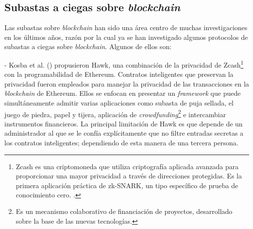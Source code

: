   \subsection{Subastas a ciegas sobre \textit{blockchain}} \hspace*{}
    Las subastas sobre \textit{blockchain} han sido una área centro de muchas investigaciones en los últimos años, razón por la cual ya se
    han investigado algunos protocolos de subastas a ciegas sobre \textit{blockchain}. Algunos de ellos son:    

    - Kosba et al. (\citeyear{kosba2016hawk}) propusieron Hawk, una combinación de la privacidad de 
    Zcash\footnote{Zcash es una criptomoneda que 
    utiliza criptografía aplicada avanzada para proporcionar una mayor privacidad a través de direcciones 
    protegidas. Es la primera aplicación práctica de zk-SNARK, un tipo específico de prueba de 
    conocimiento cero. \parencite{zcash}.} 
    con la programabilidad
    de Ethereum. Contratos inteligentes que preservan la privacidad fueron empleados para manejar la 
    privacidad de las transacciones en la \textit{blockchain} de Ethereum. Ellos se enfocan en presentar
    un \textit{framework} que puede simultáneamente admitir varias aplicaciones como subasta de puja sellada,
    el juego de piedra, papel y tijera, aplicación de \textit{crowdfunding}\footnote{Es un mecanismo colaborativo de financiación de 
    proyectos, desarrollado sobre la base de las nuevas tecnologías.} e intercambiar instrumentos 
    financieros. La principal limitación de Hawk es que depende de un administrador al que se le confía
    explícitamente que no filtre entradas secretas a los contratos inteligentes; dependiendo de esta manera
    de una tercera persona.




